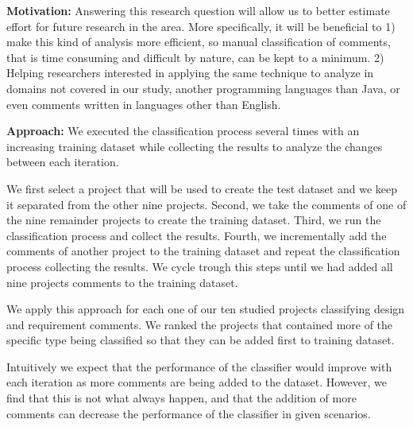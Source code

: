 
\vspace{3mm}
\noindent\rqiii
\vspace{3mm}

\noindent \textbf{Motivation:} Answering this research question will allow us to better estimate effort for future research in the area. More specifically, it will be beneficial to 1) make this kind of analysis more efficient, so manual classification of comments, that is time consuming and difficult by nature, can be kept to a minimum. 2) Helping researchers interested in applying the same technique to analyze \SATD in domains not covered in our study, another programming languages than Java, or even comments written in languages other than English. 

\vspace{1mm}
\noindent \textbf{Approach:} We executed the classification process several times with an increasing training dataset while collecting the results to analyze the changes between each iteration. 

We first select a project that will be used to create the test dataset and we keep it separated from the other nine projects. Second, we take the comments of one of the nine remainder projects to create the training dataset. Third, we run the classification process and collect the results. Fourth, we incrementally add the comments of another project to the training dataset and repeat the classification process collecting the results. We cycle trough this steps until we had added all nine projects comments to the training dataset. 

We apply this approach for each one of our ten studied projects classifying design and requirement \SATD comments. We ranked the projects that contained more \SATD of the specific type being classified so that they can be added first to training dataset. 

Intuitively we expect that the performance of the classifier would improve with each iteration as more comments are being added to the dataset. However, we find that this is not what always happen, and that the addition of more comments can decrease the performance of the classifier in given scenarios.

